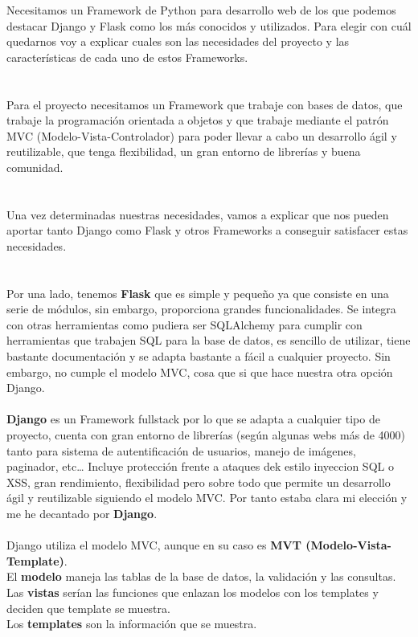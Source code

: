 Necesitamos un Framework de Python para desarrollo web de los que podemos destacar Django y Flask como los más conocidos y utilizados.
Para elegir con cuál quedarnos voy a explicar cuales son las necesidades del proyecto y las características
de cada uno de estos Frameworks.\\\\
\\
Para el proyecto necesitamos un Framework que trabaje con bases de datos, que trabaje la programación orientada a objetos y que trabaje 
mediante el patrón MVC (Modelo-Vista-Controlador) para poder llevar a cabo un desarrollo ágil y reutilizable, que tenga flexibilidad, 
un gran entorno de librerías y buena comunidad.\\
\\\\
Una vez determinadas nuestras necesidades, vamos a explicar que nos pueden aportar tanto Django como Flask y otros Frameworks a conseguir satisfacer estas necesidades.\\\\
\\
Por una lado, tenemos \textbf{Flask} que es simple y pequeño ya que consiste en una serie de módulos, sin embargo, proporciona grandes funcionalidades.
Se integra con otras herramientas como pudiera ser SQLAlchemy para cumplir con herramientas que trabajen SQL para la base de datos, es sencillo de utilizar, tiene bastante documentación y se adapta bastante a fácil a cualquier proyecto.
Sin embargo, no cumple el modelo MVC, cosa que si que hace nuestra otra opción Django.\\\\

\textbf{Django} es un Framework fullstack por lo que se adapta a cualquier tipo de proyecto, cuenta con gran entorno de librerías (según algunas webs más de 4000) tanto para sistema de autentificación de usuarios, manejo de imágenes, paginador, etc\dots
Incluye protección frente a ataques dek estilo inyeccion SQL o XSS, gran rendimiento, flexibilidad pero sobre todo que permite un desarrollo ágil y reutilizable siguiendo el modelo MVC.
Por tanto estaba clara mi elección y me he decantado por \textbf{Django}.\\\\

Django utiliza el modelo MVC, aunque en su caso es \textbf{MVT (Modelo-Vista-Template)}.\\
El \textbf{modelo} maneja las tablas de la base de datos, la validación y las consultas.\\
Las \textbf{vistas} serían las funciones que enlazan los modelos con los templates y deciden que template se muestra.\\
Los \textbf{templates} son la información que se muestra.\\ 

